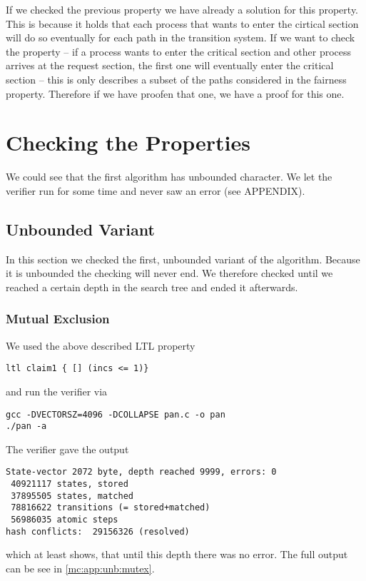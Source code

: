 \documentclass{llncs}
\begin{document}
If we checked the previous property we have already a solution for this property.
This is because it holds that each process that wants to enter the cirtical section will do so eventually for each path in
the transition system.
If we want to check the property -- if a process wants to enter the critical section and other process arrives at the request section,
the first one will eventually enter the critical section -- this is only describes a subset of the paths considered in the fairness property.
Therefore if we have proofen that one, we have a proof for this one.

\section{Checking the Properties}

We could see that the first algorithm has unbounded character. We let the verifier run for some time
and never saw an error (see APPENDIX).

\subsection{Unbounded Variant}

In this section we checked the first, unbounded variant of the algorithm.
Because it is unbounded the checking will never end. We therefore checked until we reached
a certain depth in the search tree and ended it afterwards.

\subsubsection{Mutual Exclusion}

We used the above described LTL property
\begin{lstlisting}
ltl claim1 { [] (incs <= 1)}
\end{lstlisting}
and run the verifier via
\begin{lstlisting}
gcc -DVECTORSZ=4096 -DCOLLAPSE pan.c -o pan
./pan -a
\end{lstlisting}

The verifier gave the output
\begin{lstlisting}
State-vector 2072 byte, depth reached 9999, errors: 0
 40921117 states, stored
 37895505 states, matched
 78816622 transitions (= stored+matched)
 56986035 atomic steps
hash conflicts:  29156326 (resolved)
\end{lstlisting}
which at least shows, that until this depth there was no error.
The full output can be see in \ref{mc:app:unb:mutex}.
\end{document}
